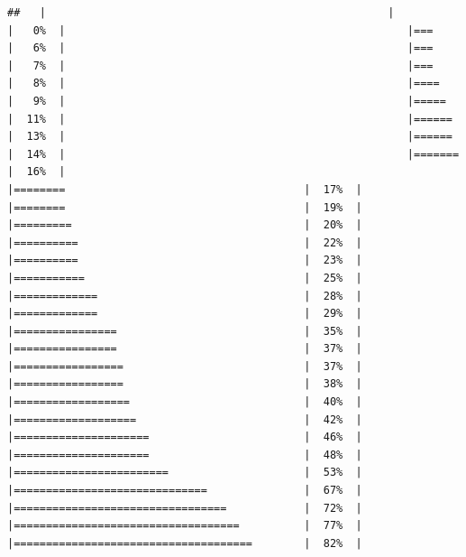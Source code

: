 \documentclass[
  krantz2]{krantz}
\begin{document}
\begin{verbatim}
##   |                                                     |                                             |   0%  |                                                     |===                                          |   6%  |                                                     |===                                          |   7%  |                                                     |===                                          |   8%  |                                                     |====                                         |   9%  |                                                     |=====                                        |  11%  |                                                     |======                                       |  13%  |                                                     |======                                       |  14%  |                                                     |=======                                      |  16%  |                                                     |========                                     |  17%  |                                                     |========                                     |  19%  |                                                     |=========                                    |  20%  |                                                     |==========                                   |  22%  |                                                     |==========                                   |  23%  |                                                     |===========                                  |  25%  |                                                     |=============                                |  28%  |                                                     |=============                                |  29%  |                                                     |================                             |  35%  |                                                     |================                             |  37%  |                                                     |=================                            |  37%  |                                                     |=================                            |  38%  |                                                     |==================                           |  40%  |                                                     |===================                          |  42%  |                                                     |=====================                        |  46%  |                                                     |=====================                        |  48%  |                                                     |========================                     |  53%  |                                                     |==============================               |  67%  |                                                     |=================================            |  72%  |                                                     |===================================          |  77%  |                                                     |=====================================        |  82%  |         
\end{verbatim}
\end{document}
